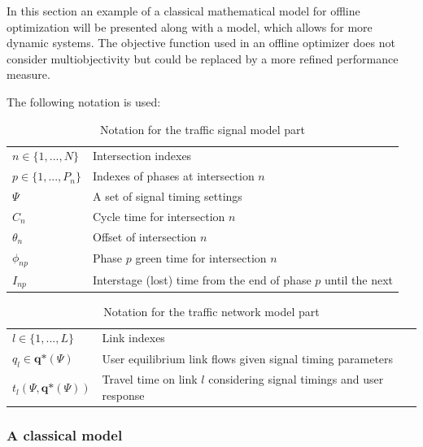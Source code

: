 \label{model}
In this section an example of a classical mathematical model for offline optimization will be presented along with a model, which allows for more dynamic systems. The objective function used in an offline optimizer does not consider multiobjectivity but could be replaced by a more refined performance measure.

The following notation is used:

\begin{table}[!ht]
\begin{center}
\begin{tabular}{ll}
\hline
$n \in \lbrace 1,...,N \rbrace$ & Intersection indexes \\
$p \in \lbrace 1,...,P_n \rbrace$ & Indexes of phases at intersection $n$ \\ 
$\Psi$ & A set of signal timing settings \\
$C_n$ & Cycle time for intersection $n$ \\
$\theta_n$ & Offset of intersection $n$ \\
$\phi_{np}$ & Phase $p$ green time for intersection $n$  \\
$I_{np}$ & Interstage (lost) time from the end of phase $p$ until the next  \\
\hline
\end{tabular}
\end{center}
\caption{Notation for the traffic signal model part}
\end{table}

\begin{table}[!ht]
\begin{center}
\begin{tabular}{ll}
\hline
$l \in \lbrace 1,...,L \rbrace$ & Link indexes \\
$q_l \in \textbf{q*}(\Psi)$ & User equilibrium link flows given signal timing parameters  \\
$t_l(\Psi,\textbf{q*}(\Psi))$ & Travel time on link $l$ considering signal timings and user response \\
\hline
\end{tabular}
\end{center}
\caption{Notation for the traffic network model part}
\end{table}

\subsubsection*{A classical model}

